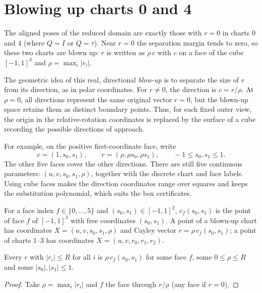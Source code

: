 \section{Blowing up charts 0 and 4}

The aligned poses of the reduced domain are exactly those with $r = 0$ in charts 0
and 4 (where $Q = I$ or $Q = \tau$). Near $r = 0$ the separation margin tends to zero, so
these two charts are blown up: $r$ is written as $\rho\, c$ with $c$ on a face of the
cube $[-1,1]^3$ and $\rho = \max_i |r_i|$.

The geometric idea of this real, directional \emph{blow-up} is to separate the size
of $r$ from its direction, as in polar coordinates. For $r\ne0$, the direction is
$c=r/\rho$. At $\rho=0$, all directions represent the same original vector $r=0$,
but the blown-up space retains them as distinct boundary points. Thus, for each
fixed outer view, the origin in the relative-rotation coordinates is replaced by
the surface of a cube recording the possible directions of approach.

For example, on the positive first-coordinate face, write
\[
  c=(1,s_0,s_1), \qquad r=(\rho,\rho s_0,\rho s_1),
  \qquad -1\le s_0,s_1\le1.
\]
The other five faces cover the other directions. There are still five continuous
parameters: $(u,v,s_0,s_1,\rho)$, together with the discrete chart and face labels.
Using cube faces makes the direction coordinates range over squares and keeps the
substitution polynomial, which suits the box certificates.

\begin{definition}
\label{def:faces}
\leanok
For a face index $f \in \{0, \dots, 5\}$ and $(s_0, s_1) \in [-1,1]^2$, $c_f(s_0, s_1)$ is
the point of face $f$ of $[-1,1]^3$ with free coordinates $(s_0, s_1)$. A point of a
blown-up chart has coordinates $X = (u, v, s_0, s_1, \rho)$ and Cayley vector
$r = \rho\, c_f(s_0, s_1)$; a point of charts 1--3 has coordinates $X = (u, v, r_0, r_1, r_2)$.
\end{definition}

\begin{lemma}
\label{lem:exists_face}
\leanok
{}
Every $r$ with $|r_i| \le R$ for all $i$ is $\rho\, c_f(s_0, s_1)$ for some face $f$,
some $0 \le \rho \le R$ and some $|s_0|, |s_1| \le 1$.
\end{lemma}
\begin{proof}
\leanok
Take $\rho = \max_i |r_i|$ and $f$ the face through $r / \rho$ (any face if $r = 0$).
\end{proof}
